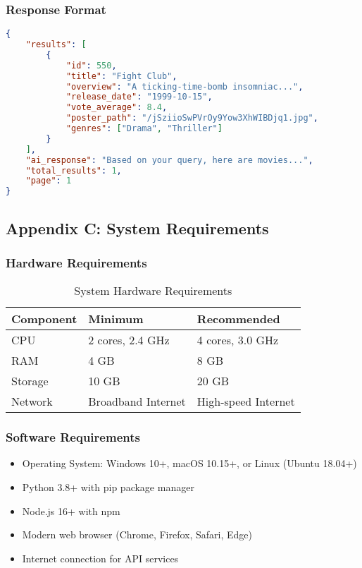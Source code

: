 \documentclass[12pt,a4paper]{article}
\begin{document}
\subsubsection{Response Format}
\begin{lstlisting}[language=json, caption=API Response Example]
{
    "results": [
        {
            "id": 550,
            "title": "Fight Club",
            "overview": "A ticking-time-bomb insomniac...",
            "release_date": "1999-10-15",
            "vote_average": 8.4,
            "poster_path": "/jSziioSwPVrOy9Yow3XhWIBDjq1.jpg",
            "genres": ["Drama", "Thriller"]
        }
    ],
    "ai_response": "Based on your query, here are movies...",
    "total_results": 1,
    "page": 1
}
\end{lstlisting}

\subsection{Appendix C: System Requirements}

\subsubsection{Hardware Requirements}
\begin{table}[h]
    \centering
    \begin{tabular}{|l|l|l|}
        \hline
        \textbf{Component} & \textbf{Minimum} & \textbf{Recommended} \\
        \hline
        CPU & 2 cores, 2.4 GHz & 4 cores, 3.0 GHz \\
        RAM & 4 GB & 8 GB \\
        Storage & 10 GB & 20 GB \\
        Network & Broadband Internet & High-speed Internet \\
        \hline
    \end{tabular}
    \caption{System Hardware Requirements}
\end{table}

\subsubsection{Software Requirements}
\begin{itemize}
    \item Operating System: Windows 10+, macOS 10.15+, or Linux (Ubuntu 18.04+)
    \item Python 3.8+ with pip package manager
    \item Node.js 16+ with npm
    \item Modern web browser (Chrome, Firefox, Safari, Edge)
    \item Internet connection for API services
\end{itemize}
\end{document}

